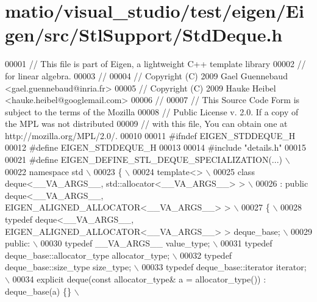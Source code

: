 \hypertarget{matio_2visual__studio_2test_2eigen_2_eigen_2src_2_stl_support_2_std_deque_8h_source}{}\section{matio/visual\+\_\+studio/test/eigen/\+Eigen/src/\+Stl\+Support/\+Std\+Deque.h}
\label{matio_2visual__studio_2test_2eigen_2_eigen_2src_2_stl_support_2_std_deque_8h_source}

\begin{DoxyCode}
00001 \textcolor{comment}{// This file is part of Eigen, a lightweight C++ template library}
00002 \textcolor{comment}{// for linear algebra.}
00003 \textcolor{comment}{//}
00004 \textcolor{comment}{// Copyright (C) 2009 Gael Guennebaud <gael.guennebaud@inria.fr>}
00005 \textcolor{comment}{// Copyright (C) 2009 Hauke Heibel <hauke.heibel@googlemail.com>}
00006 \textcolor{comment}{//}
00007 \textcolor{comment}{// This Source Code Form is subject to the terms of the Mozilla}
00008 \textcolor{comment}{// Public License v. 2.0. If a copy of the MPL was not distributed}
00009 \textcolor{comment}{// with this file, You can obtain one at http://mozilla.org/MPL/2.0/.}
00010 
00011 \textcolor{preprocessor}{#ifndef EIGEN\_STDDEQUE\_H}
00012 \textcolor{preprocessor}{#define EIGEN\_STDDEQUE\_H}
00013 
00014 \textcolor{preprocessor}{#include "details.h"}
00015 
00021 \textcolor{preprocessor}{#define EIGEN\_DEFINE\_STL\_DEQUE\_SPECIALIZATION(...) \(\backslash\)}
00022 \textcolor{preprocessor}{namespace std \(\backslash\)}
00023 \textcolor{preprocessor}{\{ \(\backslash\)}
00024 \textcolor{preprocessor}{  template<> \(\backslash\)}
00025 \textcolor{preprocessor}{  class deque<\_\_VA\_ARGS\_\_, std::allocator<\_\_VA\_ARGS\_\_> >           \(\backslash\)}
00026 \textcolor{preprocessor}{    : public deque<\_\_VA\_ARGS\_\_, EIGEN\_ALIGNED\_ALLOCATOR<\_\_VA\_ARGS\_\_> > \(\backslash\)}
00027 \textcolor{preprocessor}{  \{ \(\backslash\)}
00028 \textcolor{preprocessor}{    typedef deque<\_\_VA\_ARGS\_\_, EIGEN\_ALIGNED\_ALLOCATOR<\_\_VA\_ARGS\_\_> > deque\_base; \(\backslash\)}
00029 \textcolor{preprocessor}{  public: \(\backslash\)}
00030 \textcolor{preprocessor}{    typedef \_\_VA\_ARGS\_\_ value\_type; \(\backslash\)}
00031 \textcolor{preprocessor}{    typedef deque\_base::allocator\_type allocator\_type; \(\backslash\)}
00032 \textcolor{preprocessor}{    typedef deque\_base::size\_type size\_type;  \(\backslash\)}
00033 \textcolor{preprocessor}{    typedef deque\_base::iterator iterator;  \(\backslash\)}
00034 \textcolor{preprocessor}{    explicit deque(const allocator\_type& a = allocator\_type()) : deque\_base(a) \{\}  \(\backslash\)}

\end{DoxyCode}
